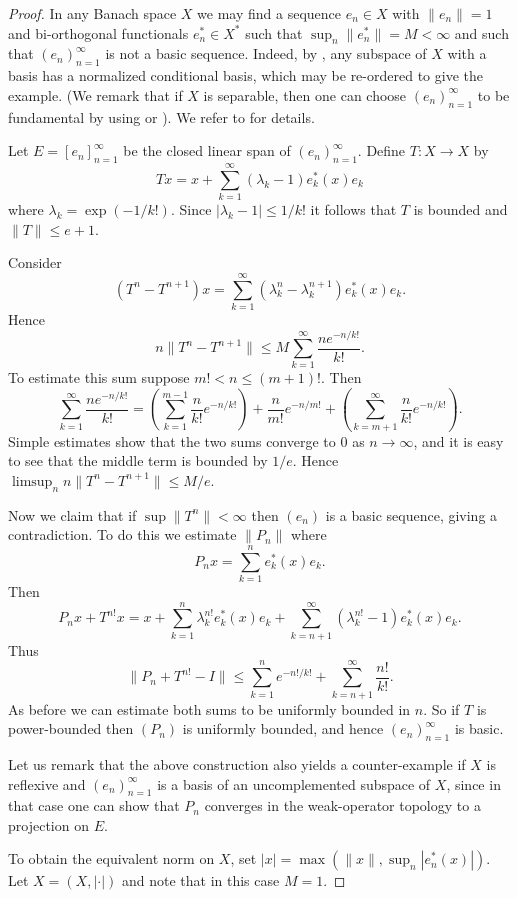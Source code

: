 \documentclass[12pt]{amsart}
\begin{document}
\begin{proof}
In any Banach space $X$ we may find a sequence $e_n\in X$ with
$\|e_n\|=1$ and bi-orthogonal functionals $e_n^*\in X^*$ such that
$\sup_n\|e_n^*\|=M<\infty$ and such that $(e_n)_{n=1}^{\infty}$ is
not a basic sequence.  Indeed, by \cite{PS}, any subspace of $X$
with a basis has a normalized conditional basis, which may be
re-ordered to give the example.  (We remark that if $X$ is
separable, then one can choose $(e_n)_{n=1}^{\infty}$ to be
fundamental by using \cite{OP} or \cite{P}).  We refer to
\cite{LT} for details.

Let $E=[e_n]_{n=1}^{\infty}$ be the closed linear span of
$(e_n)_{n=1}^{\infty}$.  Define $T:X\to X$ by
$$Tx = x+\sum_{k=1}^{\infty}(\lambda_k-1)e_k^*(x)e_k$$
where $\lambda_k=\exp(-1/k!)$.  Since $|\lambda_k-1|\le 1/k!$ it
follows that $T$ is bounded and $\|T\|\le e+1$.

Consider
$$(T^n-T^{n+1})x=
\sum_{k=1}^{\infty}(\lambda_k^n-\lambda_k^{n+1})e_k^*(x)e_k.$$
Hence
$$ n\|T^n-T^{n+1}\|\le M\sum_{k=1}^{\infty}\frac{ ne^{-n/k!}}{k!}.$$
To estimate this sum suppose $m!<n\le (m+1)!$.  Then
$$\sum_{k=1}^{\infty}\frac{ ne^{-n/k!}}{k!}=
\left(\sum_{k=1}^{m-1} \frac{n}{k!}e^{-n/k!}\right) +
\frac{n}{m!}e^{-n/m!} +
\left(\sum_{k=m+1}^{\infty}\frac{n}{k!}e^{-n/k!}\right).$$ Simple estimates
show that the two sums converge to $0$ as $n \to \infty$, and it
is easy to see that the middle term is bounded by $1/e$. Hence
$\limsup_n n\|T^n-T^{n+1}\| \le M/e$.

Now we claim that if $\sup\|T^n\|<\infty$ then $(e_n)$ is a basic
sequence, giving a contradiction. To do this we estimate $\|P_n\|$
where
$$ P_nx=\sum_{k=1}^n e_k^*(x)e_k.$$
Then
$$ P_nx+T^{n!}x= x + \sum_{k=1}^n \lambda_k^{n!}e_k^*(x)e_k
+\sum_{k=n+1}^{\infty}(\lambda_k^{n!}-1)e_k^*(x)e_k.$$ Thus
$$ \|P_n+T^{n!}-I\| \le \sum_{k=1}^n e^{-n!/k!} +
\sum_{k=n+1}^{\infty} \frac{n!}{k!}.$$ As before we can estimate
both sums to be uniformly bounded in $n$. So if $T$ is power-bounded
then $(P_n)$ is uniformly bounded, and hence
$(e_n)_{n=1}^{\infty}$ is basic.

Let us remark that the above construction also yields a
counter-example if $X$ is reflexive and $(e_n)_{n=1}^{\infty}$ is
a basis of an uncomplemented subspace of $X$, since in that case
one can show that $P_n$ converges in the weak-operator topology to
a projection on $E$.

To obtain the equivalent norm on
$X$, set $|x|=\max(\|x\|,\sup_n|e_n^*(x)|)$.  Let $X=(X,|\cdot|)$
and note that in this case $M=1$.
\end{proof}
\end{document}
